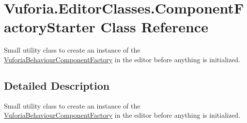 \hypertarget{class_vuforia_1_1_editor_classes_1_1_component_factory_starter}{}\section{Vuforia.\+Editor\+Classes.\+Component\+Factory\+Starter Class Reference}
\label{class_vuforia_1_1_editor_classes_1_1_component_factory_starter}


Small utility class to create an instance of the \hyperlink{class_vuforia_1_1_vuforia_behaviour_component_factory}{Vuforia\+Behaviour\+Component\+Factory} in the editor before anything is initialized.  




\subsection{Detailed Description}
Small utility class to create an instance of the \hyperlink{class_vuforia_1_1_vuforia_behaviour_component_factory}{Vuforia\+Behaviour\+Component\+Factory} in the editor before anything is initialized. 

